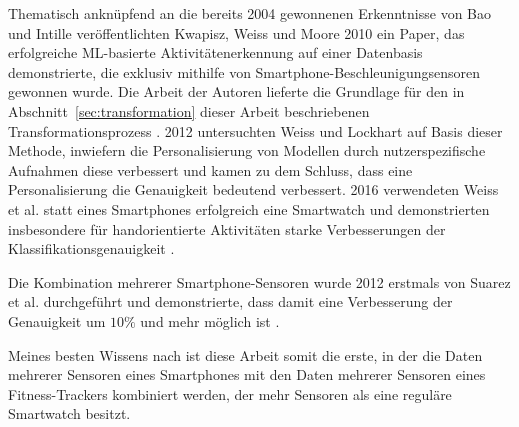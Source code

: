 Thematisch anknüpfend an die bereits 2004 gewonnenen Erkenntnisse von Bao und Intille veröffentlichten Kwapisz, Weiss und Moore 2010 ein Paper, das erfolgreiche ML-basierte Aktivitätenerkennung auf einer Datenbasis demonstrierte, die exklusiv mithilfe von Smartphone-Beschleunigungsensoren gewonnen wurde. Die Arbeit der Autoren lieferte die Grundlage für den in Abschnitt~\ref{sec:transformation} dieser Arbeit beschriebenen Transformationsprozess \cite{Kwapisz2012}. 2012 untersuchten Weiss und Lockhart auf Basis dieser Methode, inwiefern die Personalisierung von Modellen durch nutzerspezifische Aufnahmen diese verbessert und kamen zu dem Schluss, dass eine Personalisierung die Genauigkeit bedeutend verbessert. 2016 verwendeten Weiss et al. statt eines Smartphones erfolgreich eine Smartwatch und demonstrierten insbesondere für handorientierte Aktivitäten starke Verbesserungen der Klassifikationsgenauigkeit \cite{Weiss2016}.

Die Kombination mehrerer Smartphone-Sensoren wurde 2012 erstmals von Suarez et al. durchgeführt und demonstrierte, dass damit eine Verbesserung der Genauigkeit um $10 \%$ und mehr möglich ist \cite{Dernbach2012}.

Meines besten Wissens nach ist diese Arbeit somit die erste, in der die Daten mehrerer Sensoren eines Smartphones mit den Daten mehrerer Sensoren eines Fitness-Trackers kombiniert werden, der mehr Sensoren als eine reguläre Smartwatch besitzt.

